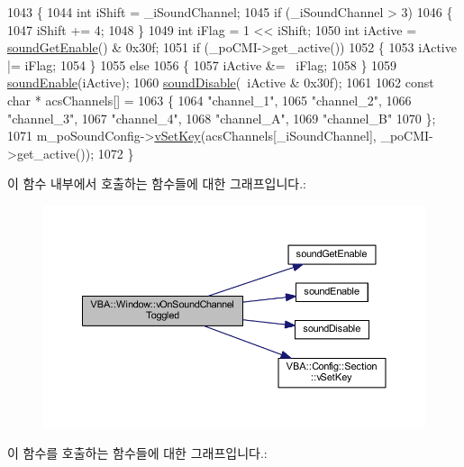 \begin{DoxyCode}
1043 \{
1044   \textcolor{keywordtype}{int} iShift = \_iSoundChannel;
1045   \textcolor{keywordflow}{if} (\_iSoundChannel > 3)
1046   \{
1047     iShift += 4;
1048   \}
1049   \textcolor{keywordtype}{int} iFlag = 1 << iShift;
1050   \textcolor{keywordtype}{int} iActive = \mbox{\hyperlink{_sound_8cpp_a3d1f6129176583804274bb162c3428a8}{soundGetEnable}}() & 0x30f;
1051   \textcolor{keywordflow}{if} (\_poCMI->get\_active())
1052   \{
1053     iActive |= iFlag;
1054   \}
1055   \textcolor{keywordflow}{else}
1056   \{
1057     iActive &= ~iFlag;
1058   \}
1059   \mbox{\hyperlink{_sound_8cpp_aa3562ee185ac50bb560c6a034475bd18}{soundEnable}}(iActive);
1060   \mbox{\hyperlink{_sound_8cpp_ac659f56970310e671066599c629618b5}{soundDisable}}(~iActive & 0x30f);
1061 
1062   \textcolor{keyword}{const} \textcolor{keywordtype}{char} * acsChannels[] =
1063   \{
1064     \textcolor{stringliteral}{"channel\_1"},
1065     \textcolor{stringliteral}{"channel\_2"},
1066     \textcolor{stringliteral}{"channel\_3"},
1067     \textcolor{stringliteral}{"channel\_4"},
1068     \textcolor{stringliteral}{"channel\_A"},
1069     \textcolor{stringliteral}{"channel\_B"}
1070   \};
1071   m\_poSoundConfig->\mbox{\hyperlink{class_v_b_a_1_1_config_1_1_section_a57e1b95cbea40db71c093381beff4b0e}{vSetKey}}(acsChannels[\_iSoundChannel], \_poCMI->get\_active());
1072 \}
\end{DoxyCode}
이 함수 내부에서 호출하는 함수들에 대한 그래프입니다.\+:
\nopagebreak
\begin{figure}[H]
\begin{center}
\leavevmode
\includegraphics[width=350pt]{class_v_b_a_1_1_window_aa64899ec70d7a82ab4eee24567585f3b_cgraph}
\end{center}
\end{figure}
이 함수를 호출하는 함수들에 대한 그래프입니다.\+:
\nopagebreak
